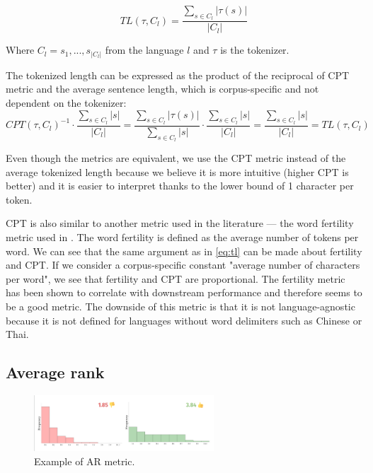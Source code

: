 \begin{equation}
\label{eq:tl_def}
    TL(\tau, C_l) = \frac{\sum_{s \in C_l}|\tau(s)|}{|C_l|}
\end{equation}

Where $C_l = {s_1, ..., s_{|C_l|}}$ from the language $l$ and $\tau$ is the tokenizer.

The tokenized length can be expressed as the product of the reciprocal of CPT metric and the average sentence length, which is corpus-specific and not dependent on the tokenizer:
\begin{equation}
\label{eq:tl}
    CPT(\tau, C_l)^{-1} \cdot \frac{\sum_{s \in C_l}|s|}{|C_l|} = \frac{\sum_{s \in C_l}|\tau(s)|}{\sum_{s \in C_l}|s|} \cdot \frac{\sum_{s \in C_l}|s|}{|C_l|} = \frac{\sum_{s \in C_l}|s|}{|C_l|} = TL(\tau, C_l)
\end{equation}

Even though the metrics are equivalent, we use the CPT metric instead of the average tokenized length because we believe it is more intuitive (higher CPT is better) and it is easier to interpret thanks to the lower bound of 1 character per token.

CPT is also similar to another metric used in the literature --- the word fertility metric used in \citet{rust_how_2021}. The word fertility is defined as the average number of tokens per word. We can see that the same argument as in \autoref{eq:tl} can be made about fertility and CPT. If we consider a corpus-specific constant "average number of characters per word", we see that fertility and CPT are proportional. The fertility metric has been shown to correlate with downstream performance and therefore seems to be a good metric. The downside of this metric is that it is not language-agnostic because it is not defined for languages without word delimiters such as Chinese or Thai.

\subsection{Average rank}

\begin{figure}[h]
    \centering
    \includegraphics[width=0.6\textwidth]{img/temp/ar_example.png}
    \caption{Example of AR metric.}
    \label{fig:ar_example}
\end{figure}

